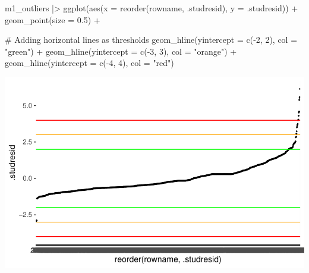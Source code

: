 \documentclass[
  letterpaper,
]{krantz}
\makeatletter
\newenvironment{Shaded}{\begin{snugshade}}{\end{snugshade}}
\newcommand{\AttributeTok}[1]{\textcolor[rgb]{0.40,0.45,0.13}{#1}}
\newcommand{\CommentTok}[1]{\textcolor[rgb]{0.37,0.37,0.37}{#1}}
\newcommand{\DecValTok}[1]{\textcolor[rgb]{0.68,0.00,0.00}{#1}}
\newcommand{\FloatTok}[1]{\textcolor[rgb]{0.68,0.00,0.00}{#1}}
\newcommand{\FunctionTok}[1]{\textcolor[rgb]{0.28,0.35,0.67}{#1}}
\newcommand{\NormalTok}[1]{\textcolor[rgb]{0.00,0.23,0.31}{#1}}
\newcommand{\SpecialCharTok}[1]{\textcolor[rgb]{0.37,0.37,0.37}{#1}}
\newcommand{\StringTok}[1]{\textcolor[rgb]{0.13,0.47,0.30}{#1}}
\newenvironment{kframe}{%
\medskip{}
\setlength{\fboxsep}{.8em}
 \def\at@end@of@kframe{}%
 \ifinner\ifhmode%
  \def\at@end@of@kframe{\end{minipage}}%
  \begin{minipage}{\columnwidth}%
 \fi\fi%
 \def\FrameCommand##1{\hskip\@totalleftmargin \hskip-\fboxsep
 \colorbox{shadecolor}{##1}\hskip-\fboxsep
     \hskip-\linewidth \hskip-\@totalleftmargin \hskip\columnwidth}%
 \MakeFramed {\advance\hsize-\width
   \@totalleftmargin\z@ \linewidth\hsize
   \@setminipage}}%
 {\par\unskip\endMakeFramed%
 \at@end@of@kframe}
\renewenvironment{Shaded}{\begin{kframe}}{\end{kframe}}
\makeatother
\begin{document}
\begin{Shaded}
\begin{Highlighting}[]
\NormalTok{m1\_outliers }\SpecialCharTok{|\textgreater{}}
  \FunctionTok{ggplot}\NormalTok{(}\FunctionTok{aes}\NormalTok{(}\AttributeTok{x =} \FunctionTok{reorder}\NormalTok{(rowname, .studresid),}
             \AttributeTok{y =}\NormalTok{ .studresid)) }\SpecialCharTok{+}
  \FunctionTok{geom\_point}\NormalTok{(}\AttributeTok{size =} \FloatTok{0.5}\NormalTok{) }\SpecialCharTok{+}
  
  \CommentTok{\# Adding horizontal lines as thresholds}
  \FunctionTok{geom\_hline}\NormalTok{(}\AttributeTok{yintercept =} \FunctionTok{c}\NormalTok{(}\SpecialCharTok{{-}}\DecValTok{2}\NormalTok{, }\DecValTok{2}\NormalTok{), }\AttributeTok{col =} \StringTok{"green"}\NormalTok{) }\SpecialCharTok{+}
  \FunctionTok{geom\_hline}\NormalTok{(}\AttributeTok{yintercept =} \FunctionTok{c}\NormalTok{(}\SpecialCharTok{{-}}\DecValTok{3}\NormalTok{, }\DecValTok{3}\NormalTok{), }\AttributeTok{col =} \StringTok{"orange"}\NormalTok{) }\SpecialCharTok{+}
  \FunctionTok{geom\_hline}\NormalTok{(}\AttributeTok{yintercept =} \FunctionTok{c}\NormalTok{(}\SpecialCharTok{{-}}\DecValTok{4}\NormalTok{, }\DecValTok{4}\NormalTok{), }\AttributeTok{col =} \StringTok{"red"}\NormalTok{)}
\end{Highlighting}
\end{Shaded}

\includegraphics{13_regressions_files/figure-latex/plot-outliers-ext-stud-resid-1.pdf}
\end{document}
